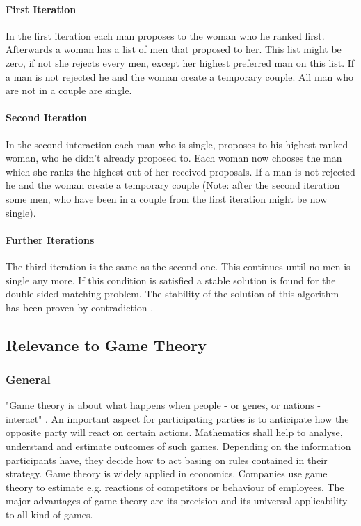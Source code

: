 \paragraph{First Iteration\\}
In the first iteration each man proposes to the woman who he ranked first.
Afterwards a woman has a list of men that proposed to her. This list might be zero, if not she rejects every men, except her highest preferred man on this list.
If a man is not rejected he and the woman create a temporary couple.
All man who are not in a couple are single.

\paragraph{Second Iteration\\}
In the second interaction each man who is single, proposes to his highest ranked woman, who he didn't already proposed to.
Each woman now chooses the man which she ranks the highest out of her received proposals.
If a man is not rejected he and the woman create a temporary couple (Note: after the second iteration some men, who have been in a couple from the first iteration might be now single).

\paragraph{Further Iterations\\}
The third iteration is the same as the second one.
This continues until no men is single any more.
If this condition is satisfied a stable solution is found for the double sided matching problem.
The stability of the solution of this algorithm has been proven by contradiction \cite{gale62a}.

\subsection{Relevance to Game Theory}

\subsubsection{General}
"Game theory is about what happens when people - or genes, or nations - interact" \cite[p. 1]{camerer2003behavioral}.
An important aspect for participating parties is to anticipate how the opposite party will react on certain actions.
Mathematics shall help to analyse, understand and estimate outcomes of such games. 
Depending on the information participants have, they decide how to act basing on rules contained in their strategy.
Game theory is widely applied in economics.
Companies use game theory to estimate e.g. reactions of competitors or behaviour of employees.
The major advantages of game theory are its precision and its universal applicability to all kind of games. \cite[pp. 1-3]{camerer2003behavioral}

